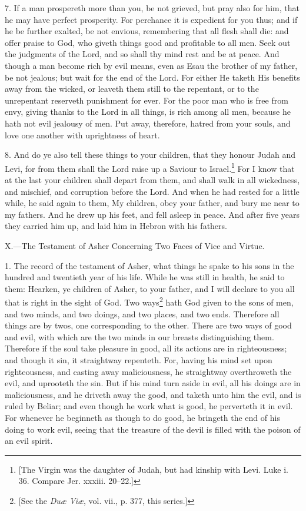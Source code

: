 7. If a man prospereth more than you, be not grieved, but pray also for him, that he may have perfect prosperity. For perchance it is expedient for you thus; and if he be further exalted, be not envious, remembering that all flesh shall die: and offer praise to God, who giveth things good and profitable to all men. Seek out the judgments of the Lord, and so shall thy mind rest and be at peace. And though a man become rich by evil means, even as Esau the brother of my father, be not jealous; but wait for the end of the Lord. For either He taketh His benefits away from the wicked, or leaveth them still to the repentant, or to the unrepentant reserveth punishment for ever. For the poor man who is free from envy, giving thanks to the Lord in all things, is rich among all men, because he hath not evil jealousy of men. Put away, therefore, hatred from your souls, and love one another with uprightness of heart.

8. And do ye also tell these things to your children, that they honour Judah and Levi, for from them shall the Lord raise up a Saviour to Israel.\footnote{[The Virgin was the daughter of Judah, but had kinship with Levi. Luke i. 36. Compare Jer. xxxiii. 20–22.]} For I know that at the last your children shall depart from them, and shall walk in all wickedness, and mischief, and corruption before the Lord. And when he had rested for a little while, he said again to them, My children, obey your father, and bury me near to my fathers. And he drew up his feet, and fell asleep in peace. And after five years they carried him up, and laid him in Hebron with his fathers.


X.—The Testament of Asher Concerning Two Faces of Vice and Virtue.

1. The record of the testament of Asher, what things he spake to his sons in the hundred and twentieth year of his life. While he was still in health, he said to them: Hearken, ye children of Asher, to your father, and I will declare to you all that is right in the sight of God. Two ways\footnote{[See the \emph{Duæ Viæ}, vol. vii., p. 377, this series.]} hath God given to the sons of men, and two minds, and two doings, and two places, and two ends. Therefore all things are by twos, one corresponding to the other. There are two ways of good and evil, with which are the two minds in our breasts distinguishing them. Therefore if the soul take pleasure in good, all its actions are in righteousness; and though it sin, it straightway repenteth. For, having his mind set upon righteousness, and casting away maliciousness, he straightway overthroweth the evil, and uprooteth the sin. But if his mind turn aside in evil, all his doings are in maliciousness, and he driveth away the good, and taketh unto him the evil, and is ruled by Beliar; and even though he work what is good, he perverteth it in evil. For whenever he beginneth as though to do good, he bringeth the end of his doing to work evil, seeing that the treasure of the devil is filled with the poison of an evil spirit.

